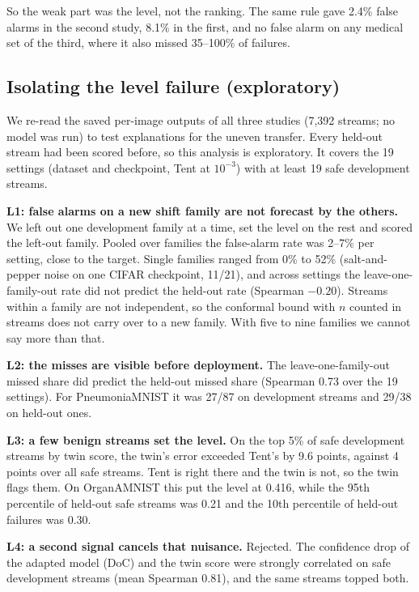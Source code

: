 \documentclass[runningheads]{llncs}
\begin{document}
So the weak part was the level, not the ranking. The same rule gave 2.4\% false alarms in the second study, 8.1\% in the first, and no false alarm on any medical set of the third, where it also missed 35--100\% of failures.

\subsection{Isolating the level failure (exploratory)}
\label{sec:level}
We re-read the saved per-image outputs of all three studies (7,392 streams; no model was run) to test explanations for the uneven transfer. Every held-out stream had been scored before, so this analysis is exploratory. It covers the 19 settings (dataset and checkpoint, Tent at $10^{-3}$) with at least 19 safe development streams.

\textbf{L1: false alarms on a new shift family are not forecast by the others.} We left out one development family at a time, set the level on the rest and scored the left-out family. Pooled over families the false-alarm rate was 2--7\% per setting, close to the target. Single families ranged from 0\% to 52\% (salt-and-pepper noise on one CIFAR checkpoint, 11/21), and across settings the leave-one-family-out rate did not predict the held-out rate (Spearman $-0.20$). Streams within a family are not independent, so the conformal bound with $n$ counted in streams does not carry over to a new family. With five to nine families we cannot say more than that.

\textbf{L2: the misses are visible before deployment.} The leave-one-family-out missed share did predict the held-out missed share (Spearman 0.73 over the 19 settings). For PneumoniaMNIST it was 27/87 on development streams and 29/38 on held-out ones.

\textbf{L3: a few benign streams set the level.} On the top 5\% of safe development streams by twin score, the twin's error exceeded Tent's by 9.6 points, against 4 points over all safe streams. Tent is right there and the twin is not, so the twin flags them. On OrganAMNIST this put the level at 0.416, while the 95th percentile of held-out safe streams was 0.21 and the 10th percentile of held-out failures was 0.30.

\textbf{L4: a second signal cancels that nuisance.} Rejected. The confidence drop of the adapted model (DoC) and the twin score were strongly correlated on safe development streams (mean Spearman 0.81), and the same streams topped both.
\end{document}
